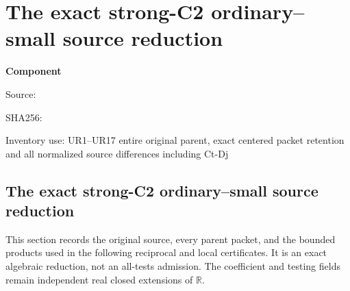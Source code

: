 \chapter{The exact strong-C2 ordinary--small source reduction}
\label{component:pc3daa35e9a9b}
\noindent\textbf{Component }\par
{\small\noindent Source: \par}
{\small\noindent SHA256: \par}
{\small\noindent Inventory use: UR1--UR17 entire original parent, exact centered packet retention and all normalized source differences including Ct-Dj\par}
\medskip
\section[The exact strong-C2 ordinary--small source reduction]{The exact strong-C2 ordinary--small source reduction}
\label{pc3daa35e9a9b:sec:ui-full-parent-reduction}

This section records the original source, every parent packet, and the
bounded products used in the following reciprocal and local certificates.
It is an exact algebraic reduction, not an all-tests admission. The
coefficient and testing fields remain independent real closed extensions
of $\mathbb R$.

